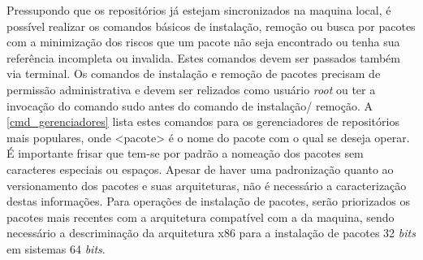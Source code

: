 Pressupondo que os repositórios já estejam sincronizados na maquina local, é possível realizar os comandos básicos de instalação, remoção ou busca por pacotes com a minimização dos riscos que um pacote não seja encontrado ou tenha sua referência incompleta ou invalida.  Estes comandos devem ser passados também via terminal. Os comandos de instalação e remoção de pacotes precisam de permissão administrativa e devem ser relizados como usuário \textit{root} ou ter a invocação do comando {\code sudo} antes do comando de instalação/ remoção. A \autoref{cmd_gerenciadores} lista estes comandos para os gerenciadores de repositórios mais populares, onde {\code <pacote>} é o nome do pacote com o qual se deseja operar. É importante frisar que tem-se por padrão a nomeação dos pacotes sem caracteres especiais ou espaços. Apesar de haver uma padronização quanto ao versionamento dos pacotes e suas arquiteturas, não é necessário a caracterização destas informações. Para operações de instalação de pacotes, serão priorizados os pacotes mais recentes com a arquitetura compatível com a da maquina, sendo necessário a descriminação da arquitetura {\code x86} para a instalação de pacotes 32 \textit{bits} em sistemas 64 \textit{bits}.

\begin{table}[htbp]
\caption{Principais comandos dos gerenciadores de repositórios mais populares.}
\label{cmd_gerenciadores}
\end{table}

